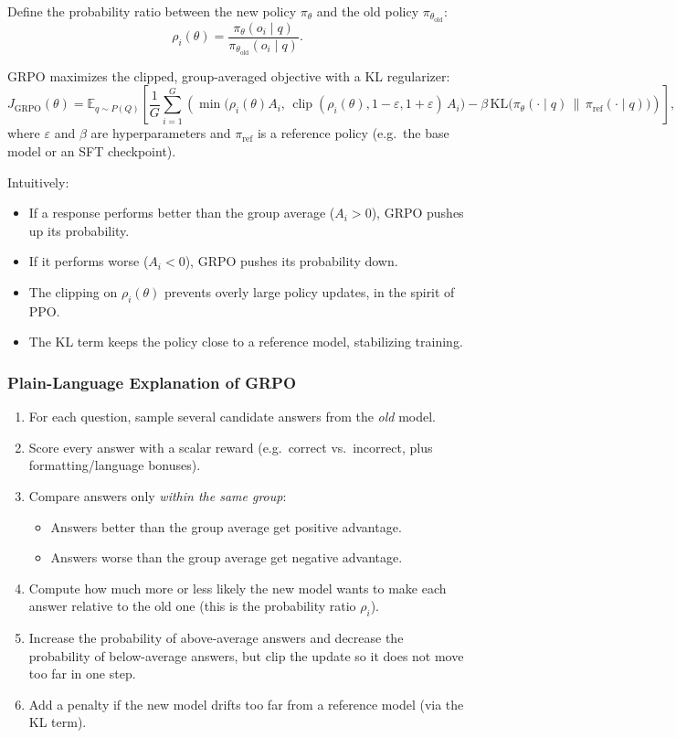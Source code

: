 \documentclass[11pt]{article}
\theoremstyle{remark}
\newcommand{\highlight}[1]{\colorbox{yellow!40}{#1}}
\begin{document}
Define the \highlight{ probability ratio } between the new policy $\pi_\theta$ and the old policy $\pi_{\theta_{\text{old}}}$:
\[
\rho_i(\theta) = \frac{\pi_\theta(o_i \mid q)}{\pi_{\theta_{\text{old}}}(o_i \mid q)}.
\]

GRPO maximizes the \highlight{ clipped, group-averaged objective with a KL regularizer}:
\[
J_{\text{GRPO}}(\theta)
=
\mathbb{E}_{q \sim P(Q)}
\left[
\frac{1}{G}
\sum_{i=1}^G
\left(
\min\!\big(
\rho_i(\theta) A_i,\,
\operatorname{clip}(\rho_i(\theta), 1-\varepsilon, 1+\varepsilon)\,A_i
\big)
- \beta \, \text{KL}\big(\pi_\theta(\cdot\mid q)\,\|\,\pi_{\text{ref}}(\cdot\mid q)\big)
\right)
\right],
\]
where $\varepsilon$ and $\beta$ are hyperparameters and $\pi_{\text{ref}}$ is a reference policy (e.g.\ the base model or an SFT checkpoint).

Intuitively:
\begin{itemize}
  \item If a response performs better than the group average ($A_i > 0$), GRPO pushes up its probability.
  \item If it performs worse ($A_i < 0$), GRPO pushes its probability down.
  \item The clipping on $\rho_i(\theta)$ prevents overly large policy updates, in the spirit of PPO.
  \item The KL term keeps the policy close to a reference model, stabilizing training.
\end{itemize}

\subsubsection*{Plain-Language Explanation of GRPO}

\begin{enumerate}[label=\arabic*)]
  \item For each question, sample several candidate answers from the \emph{old} model.
  \item Score every answer with a scalar reward (e.g.\ correct vs.\ incorrect, plus formatting/language bonuses).
  \item Compare answers only \emph{within the same group}:
  \begin{itemize}
    \item Answers better than the group average get positive advantage.
    \item Answers worse than the group average get negative advantage.
  \end{itemize}
  \item Compute how much more or less likely the \highlight{new} model wants to make each answer relative to the old one (this is the probability ratio $\rho_i$).
  \item Increase the probability of above-average answers and decrease the probability of below-average answers, but clip the update so it does not move too far in one step.
  \item Add a penalty if the new model drifts too far from a reference model (via the KL term).
\end{enumerate}
\end{document}
